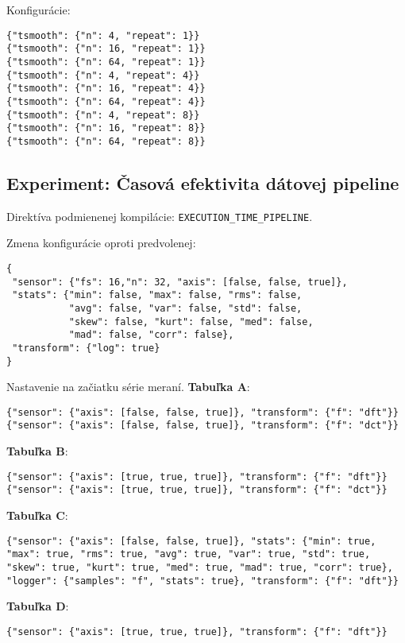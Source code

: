 \noindent Konfigurácie:
\begin{lstlisting}[style=experiments]
{"tsmooth": {"n": 4, "repeat": 1}}
{"tsmooth": {"n": 16, "repeat": 1}}
{"tsmooth": {"n": 64, "repeat": 1}}
{"tsmooth": {"n": 4, "repeat": 4}}
{"tsmooth": {"n": 16, "repeat": 4}}
{"tsmooth": {"n": 64, "repeat": 4}}
{"tsmooth": {"n": 4, "repeat": 8}}
{"tsmooth": {"n": 16, "repeat": 8}}
{"tsmooth": {"n": 64, "repeat": 8}}
\end{lstlisting}


\subsection*{Experiment: Časová efektivita dátovej pipeline}
\noindent Direktíva podmienenej kompilácie: \verb|EXECUTION_TIME_PIPELINE|.

\noindent Zmena konfigurácie oproti predvolenej:
\begin{lstlisting}[style=messages]
{
 "sensor": {"fs": 16,"n": 32, "axis": [false, false, true]}, 
 "stats": {"min": false, "max": false, "rms": false, 
 		   "avg": false, "var": false, "std": false, 
 		   "skew": false, "kurt": false, "med": false, 
 		   "mad": false, "corr": false},
 "transform": {"log": true}
}
\end{lstlisting}

\noindent Nastavenie na začiatku série meraní. \textbf{Tabuľka A}:
\begin{lstlisting}[style=experiments]
{"sensor": {"axis": [false, false, true]}, "transform": {"f": "dft"}}
{"sensor": {"axis": [false, false, true]}, "transform": {"f": "dct"}}
\end{lstlisting}

\textbf{Tabuľka B}:
\begin{lstlisting}[style=experiments]
{"sensor": {"axis": [true, true, true]}, "transform": {"f": "dft"}}
{"sensor": {"axis": [true, true, true]}, "transform": {"f": "dct"}}
\end{lstlisting}

\textbf{Tabuľka C}:
\begin{lstlisting}[style=experiments]
{"sensor": {"axis": [false, false, true]}, "stats": {"min": true, "max": true, "rms": true, "avg": true, "var": true, "std": true, "skew": true, "kurt": true, "med": true, "mad": true, "corr": true},  "logger": {"samples": "f", "stats": true}, "transform": {"f": "dft"}}
\end{lstlisting}

\textbf{Tabuľka D}:
\begin{lstlisting}[style=experiments]
{"sensor": {"axis": [true, true, true]}, "transform": {"f": "dft"}}
\end{lstlisting}

